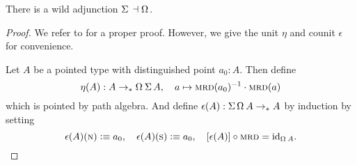 \documentclass[english,a4paper]{lmcs}
\def\githubpath{\tt\small}
\begin{document}
\begin{prop}
  There is a wild adjunction $\susp \null \leftadjto \loopspace \null$.
  \label{prop:susp-loop-adjunction}
\end{prop}
\begin{proof}
  We refer to \cite[\githubpath
  theorems/homotopy/SuspAdjointLoop.agda]{hott-agda} for a proper proof.
  However, we give the unit $\eta$ and counit $\epsilon$ for convenience.

  Let $A$ be a pointed type with distinguished point $a_0:A$. Then define
  \begin{displaymath}
    \eta(A) : A \ptdto \loopspace\null\susp A, \quad
    a \mapsto \inv{\mrd(a_0)} \cdot \mrd(a)
  \end{displaymath}
  which is pointed by path algebra.
  And define $\epsilon(A) : \susp \loopspace \null A \ptdto A$ by induction by
  setting
  \begin{displaymath}
    \epsilon(A)(\north) \defequi a_0,\quad
    \epsilon(A)(\south) \defequi a_0,\quad
    \ap{\epsilon(A)}\circ \mrd = \id_{\loopspace\null A}.\qedhere
  \end{displaymath}

\end{proof}
\end{document}
